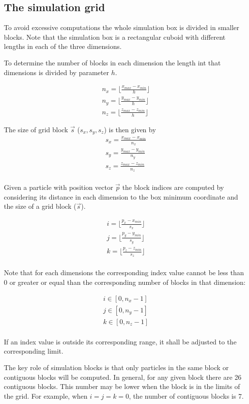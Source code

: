 \subsection{The simulation grid}

To avoid excessive computations the whole simulation box is divided in smaller
blocks. Note that the simulation box is a rectangular cuboid with different
lengths in each of the three dimensions. 

To determine the number of blocks in each dimension the length int that
dimensions is divided by parameter $h$.

\[
\begin{split}
n_x = \lfloor \frac{x_{max}- x_{min}}{h} \rfloor\\
n_y = \lfloor \frac{y_{max}- y_{min}}{h} \rfloor\\
n_z = \lfloor \frac{z_{max}- z_{min}}{h} \rfloor
\end{split}
\]

The size of grid block $\vec{s}$ ($s_x, s_y, s_z$) is then given by
\[
\begin{split}
s_x = \frac{x_{max} - x_{min}}{n_x}\\
s_y = \frac{y_{max} - y_{min}}{n_y}\\
s_z = \frac{z_{max} - z_{min}}{n_z}\\
\end{split}
\] 

Given a particle with position vector $\vec{p}$ the block indices are computed
by considering its distance in each dimension to the box minimum coordinate
and the size of a grid block ($\vec{s}$).

\[
\begin{split}
i = \lfloor \frac{p_x - x_{min}}{s_x} \rfloor\\
j = \lfloor \frac{p_y - y_{min}}{s_y} \rfloor\\
k = \lfloor \frac{p_z - z_{min}}{s_z} \rfloor\\
\end{split}
\]

Note that for each dimensions the corresponding index value cannot be less than
$0$ or greater or equal than the corresponding number of blocks in that
dimension:

\[
\begin{split}
i \in [0, n_x-1]\\
j \in [0, n_y-1]\\
k \in [0, n_z-1]\\
\end{split}
\]

If an index value is outside its corresponding range, it shall be adjusted to
the corresponding limit.

The key role of simulation blocks is that only particles in the same block or
contiguous blocks will be computed. In general, for any given block there are
26 contiguous blocks. This number may be lower when the block is in the limits
of the grid. For example, when $i=j=k=0$, the number of contiguous blocks is 7.
